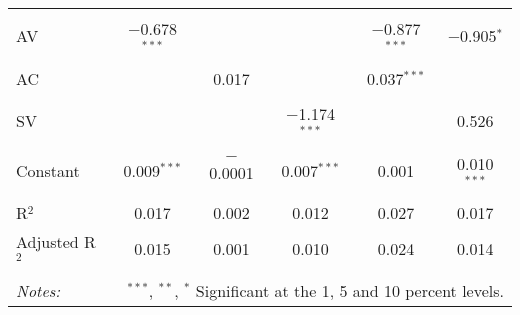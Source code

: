 
\begin{tabular}{@{\extracolsep{5pt}}lccccc} 
\\[-1.8ex] %
\hline \\[-1.8ex] 
 AV & $-$0.678$^{***}$ &  &  & $-$0.877$^{***}$ & $-$0.905$^{*}$ \\ 
  & & & & & \\ 
 AC &  & 0.017 &  & 0.037$^{***}$ &  \\ 
  & & & & & \\ 
 SV &  &  & $-$1.174$^{***}$ &  & 0.526 \\ 
  & & & & & \\ 
 Constant & 0.009$^{***}$ & $-$0.0001 & 0.007$^{***}$ & 0.001 & 0.010$^{***}$ \\ 
  & & & & & \\ 
R$^{2}$ & 0.017 & 0.002 & 0.012 & 0.027 & 0.017 \\ 
Adjusted R$^{2}$ & 0.015 & 0.001 & 0.010 & 0.024 & 0.014 \\ 
\hline 
\hline \\[-1.8ex] 
\textit{Notes:} & \multicolumn{5}{r}{$^{***}$, $^{**}$, $^{*}$ Significant at the 1, 5 and 10 percent levels.} \\ 
\end{tabular} 
